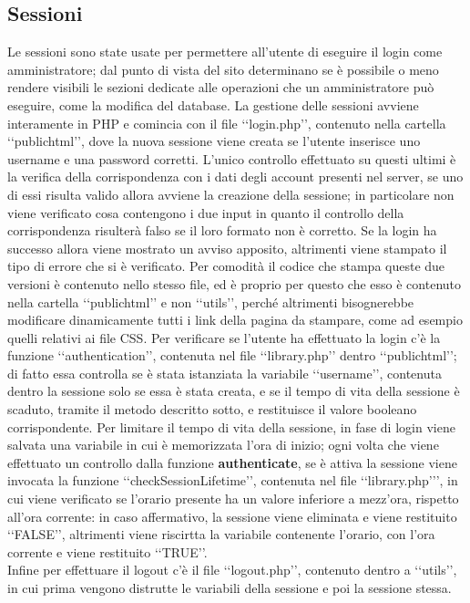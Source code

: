 {	\subsection{Sessioni}{
		Le sessioni sono state usate per permettere all'utente di eseguire il login come amministratore; dal punto di vista del sito determinano se è possibile o meno rendere visibili le sezioni dedicate alle operazioni che un amministratore può eseguire, come la modifica del database. La gestione delle sessioni avviene interamente in PHP e comincia con il file ‘‘login.php’’, contenuto nella cartella ‘‘public\textunderscore html’’, dove la nuova sessione viene creata se l'utente inserisce uno username e una password corretti. L'unico controllo effettuato su questi ultimi è la verifica della corrispondenza con i dati degli account presenti nel server, se uno di essi risulta valido allora avviene la creazione della sessione; in particolare non viene verificato cosa contengono i due input in quanto il controllo della corrispondenza risulterà falso se il loro formato non è corretto. Se la login ha successo allora viene mostrato un avviso apposito, altrimenti viene stampato il tipo di errore che si è verificato. Per comodità il codice che stampa queste due versioni è contenuto nello stesso file, ed è proprio per questo che esso è contenuto nella cartella ‘‘public\textunderscore html’’ e non ‘‘utils’’, perché altrimenti bisognerebbe modificare dinamicamente tutti i link della pagina da stampare, come ad esempio quelli relativi ai file CSS.
		Per verificare se l'utente ha effettuato la login c'è la funzione ‘‘authentication’’, contenuta nel file ‘‘library.php’’ dentro ‘‘public\textunderscore html’’; di fatto essa controlla se è stata istanziata la variabile ‘‘username’’, contenuta dentro la sessione solo se essa è stata creata, e se il tempo di vita della sessione è scaduto, tramite il metodo descritto sotto, e restituisce il valore booleano corrispondente.
		Per limitare il tempo di vita della sessione, in fase di login viene salvata una variabile in cui è memorizzata l'ora di inizio; ogni volta che viene effettuato un controllo dalla funzione \textbf{authenticate}, se è attiva la sessione viene invocata la funzione ‘‘checkSessionLifetime’’, contenuta nel file ‘‘library.php’’’, in cui viene verificato se l'orario presente ha un valore inferiore a mezz'ora, rispetto all'ora corrente: in caso affermativo, la sessione viene eliminata e viene restituito ‘‘FALSE’’, altrimenti viene riscirtta la variabile contenente l'orario, con l'ora corrente e viene restituito ‘‘TRUE’’.\\
		Infine per effettuare il logout c'è il file ‘‘logout.php’’, contenuto dentro a ‘‘utils’’, in cui prima vengono distrutte le variabili della sessione e poi la sessione stessa.
	}
}